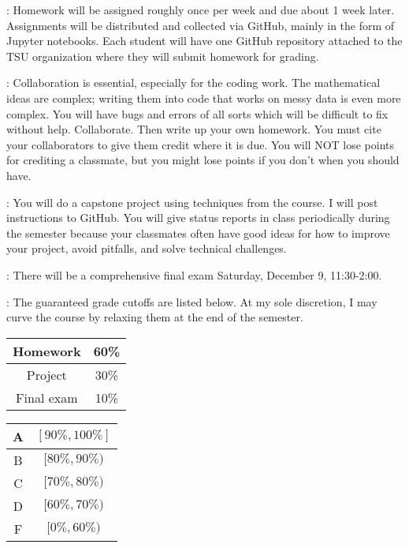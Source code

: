 \documentclass[letterpaper]{article}
\begin{document}
\bu[Homework]: Homework will be assigned roughly once per week and due about 1 week later.  Assignments will be distributed and collected via GitHub, mainly in the form of Jupyter notebooks.  Each student will have one GitHub repository attached to the TSU organization where they will submit homework for grading.

\bu[Collaboration]: Collaboration is essential, especially for the coding work.  The mathematical ideas are complex; writing them into code that works on messy data is even more complex.  You will have bugs and errors of all sorts which will be difficult to fix without help.  Collaborate.  Then write up your own homework.  You must cite your collaborators to give them credit where it is due.  You will NOT lose points for crediting a classmate, but you might lose points if you don't when you should have.

\bu[Project]: You will do a capstone project using techniques from the course.  I will post instructions to GitHub.  You will give status reports in class periodically during the semester because your classmates often have good ideas for how to improve your project, avoid pitfalls, and solve technical challenges.

\bu[Exams]: There will be a comprehensive final exam Saturday, December 9, 11:30-2:00.

: The guaranteed grade cutoffs are listed below.  At my sole discretion, I may curve the course by relaxing them at the end of the semester.
\begin{center}
	\begin{tabular}{|c|c|} \hline
		Homework & 60\% \\ \hline
		Project & 30\% \\ \hline
		Final exam & 10\% \\ \hline
	\end{tabular}
	\quad
	\begin{tabular}{|c|c|} \hline
		A & $[90\%,100\%]$\\ \hline
		B & $[80\%,90\%)$\\ \hline
		C & $[70\%,80\%)$\\ \hline
		D & $[60\%,70\%)$\\ \hline
		F & $[0\%,60\%)$\\ \hline
	\end{tabular}
\end{center}
\end{document}
